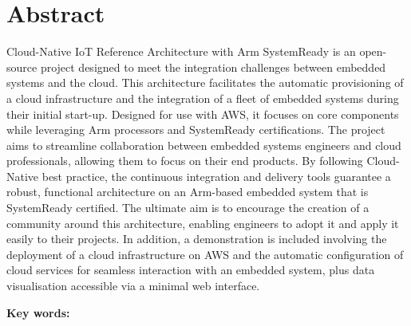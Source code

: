 
\chapter*{Abstract}


Cloud-Native IoT Reference Architecture with Arm SystemReady is an open-source project designed to meet the integration challenges between embedded systems and the cloud. This architecture facilitates the automatic provisioning of a cloud infrastructure and the integration of a fleet of embedded systems during their initial start-up. Designed for use with AWS, it focuses on core components while leveraging Arm processors and SystemReady certifications. The project aims to streamline collaboration between embedded systems engineers and cloud professionals, allowing them to focus on their end products. By following Cloud-Native best practice, the continuous integration and delivery tools guarantee a robust, functional architecture on an Arm-based embedded system that is SystemReady certified. The ultimate aim is to encourage the creation of a community around this architecture, enabling engineers to adopt it and apply it easily to their projects. In addition, a demonstration is included involving the deployment of a cloud infrastructure on AWS and the automatic configuration of cloud services for seamless interaction with an embedded system, plus data visualisation accessible via a minimal web interface.

\vspace{0.5cm}
\textbf{Key words:}
\Keywords
